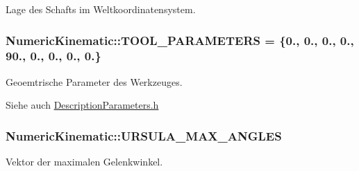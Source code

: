 Lage des Schafts im Weltkoordinatensystem. \hypertarget{classNumericKinematic_ae23ea272ef83d6d3285730fe33fa250b}{
\subsubsection[{T\-O\-O\-L\-\_\-\-P\-A\-R\-A\-M\-E\-T\-E\-R\-S}]{\setlength{\rightskip}{0pt plus 5cm}Numeric\-Kinematic\-::\-T\-O\-O\-L\-\_\-\-P\-A\-R\-A\-M\-E\-T\-E\-R\-S = \{0., 0., 0., 0., 90., 0., 0., 0., 0.\}\hspace{0.3cm}{\ttfamily [private]}}}\label{classNumericKinematic_ae23ea272ef83d6d3285730fe33fa250b}


Geoemtrische Parameter des Werkzeuges. 

\begin{DoxySeeAlso}{Siehe auch}
\hyperlink{DescriptionParameters_8h_source}{Description\-Parameters.\-h} 
\end{DoxySeeAlso}
\hypertarget{classNumericKinematic_a562cfd1d8c6b0f0074fb2796e8fbff13}{
\subsubsection[{U\-R\-S\-U\-L\-A\-\_\-\-M\-A\-X\-\_\-\-A\-N\-G\-L\-E\-S}]{\setlength{\rightskip}{0pt plus 5cm}Numeric\-Kinematic\-::\-U\-R\-S\-U\-L\-A\-\_\-\-M\-A\-X\-\_\-\-A\-N\-G\-L\-E\-S\hspace{0.3cm}{\ttfamily [private]}}}\label{classNumericKinematic_a562cfd1d8c6b0f0074fb2796e8fbff13}


Vektor der maximalen Gelenkwinkel. 

